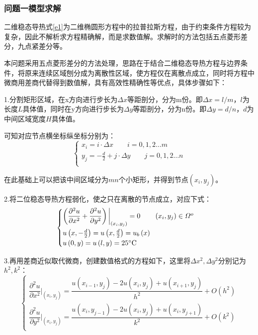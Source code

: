 \documentclass[a4paper,12pt]{ctexart} %
\begin{document}
	\subsubsection{问题一模型求解}
	二维稳态导热式\ref{e1}为二维椭圆形方程中的拉普拉斯方程，由于约束条件方程较为复杂，因此不解析求方程精确解，而是求数值解\cite{ref3}。求解时的方法包括五点菱形差分，九点紧差分等。\par
	本问题采用五点菱形差分的方法处理，思路在于结合二维稳态导热方程与边界条件，将原来连续区域刨分成为离散性区域，使方程仅在离散点成立，同时将方程中微商用差商代替得到数值解，具有高效性精确性等优点，具体步骤如下：\par
	1.分割矩形区域，在x方向进行步长为$\varDelta x$等距剖分，分为m份。即$\varDelta x=l/m$，$l$为长度$L$具体值，同时在y方向进行步长为$\varDelta y $等距剖分，分为n份。即$\varDelta y=d/n$，$d$为中间区域宽度$H$具体值。\par
	可知对应节点横坐标纵坐标分别为：
	\begin{equation}
	\begin{cases}
	x_i=i\cdot \varDelta x\quad\quad i=0,1,2\dots m\\
	y_j=-\frac{d}{2}+j\cdot \varDelta y\quad\quad j=0,1,2\dots n \\
	\end{cases}
	\end{equation}\par
	在此基础上可以把该中间区域分为$mn$个小矩形，并得到节点$\left(x_i,y_j\right)$。\par
	2.将二位稳态导热方程弱化，使之只在离散的节点成立，对应下式：
	\begin{equation}
	\begin{cases}
	\left(\dfrac{\partial^2 u}{\partial x^2}+\dfrac{\partial^2 u}{\partial y^2}\right)\bigg|_{\left(x_i,y_j\right)}=0\quad\quad \left(x_i,y_j\right)\in\varOmega^o\\[1em]
	u\left(x,-\frac{d}{2}\right)=u\left(x,\frac{d}{2}\right)=u_b\left(x\right)\\
	u\left(0,y\right)=u\left(l,y\right)=25\degree\mathrm C\\
	\end{cases}
	\end{equation}\par
	3.再用差商近似取代微商，创建数值格式的方程如下，这里将$\varDelta x^2,\varDelta y^2$分别记为$h^2,k^2$：
	\begin{equation}
	\begin{cases}
	\dfrac{\partial^2 u}{\partial x^2}\bigg|_{\left(x_i,y_j\right)}=\dfrac{u\left(x_{i-1},y_j\right)-2u\left(x_i,y_j\right)+u\left(x_{i+1},y_j\right)}{h^2}+O\left(h^2\right)\\[1em]
	\dfrac{\partial^2 u}{\partial y^2}\bigg|_{\left(x_i,y_j\right)}=\dfrac{u\left(x_i,y_{j-1}\right)-2u\left(x_i,y_j\right)+u\left(x_i,y_{j+1}\right)}{k^2}+O\left(k^2\right)\\
	\end{cases}
	\end{equation}\par
\end{document}
